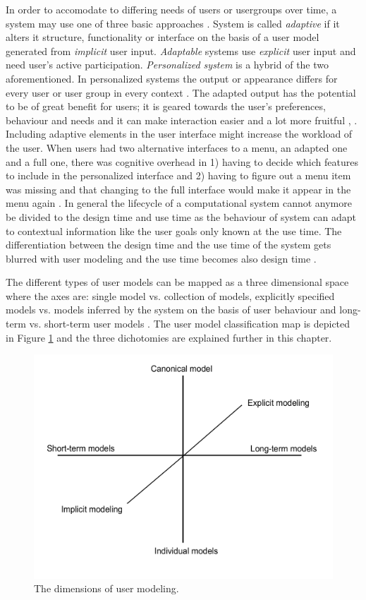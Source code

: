 \documentclass{sigchi}
\begin{document}
In order to accomodate to differing needs of users or usergroups over time, a system may use one of three basic approaches \cite{van08}. System is called \textit{adaptive} if it alters it structure, functionality or interface on the basis of a user model generated from \textit{implicit} user input. \textit{Adaptable} systems use \textit{explicit} user input and need user's active participation. \textit{Personalized system} is a hybrid of the two aforementioned. In personalized systems the output or appearance differs for every user or user group in every context \cite{van08}. The adapted output has the potential to be of great benefit for users; it is geared towards the user's preferences, behaviour and needs and it can make interaction easier and a lot more fruitful \cite{van08},\cite{brusi96} . Including adaptive elements in the user interface might increase the workload of the user. When users had two alternative interfaces to a menu, an adapted one and a full one, there was cognitive overhead in 1) having to decide which features to include in the personalized interface and 2) having to figure out a menu item was missing and that changing to the full interface would make it appear in the menu again \cite{bunt04}. In general the lifecycle of a computational system cannot anymore be divided to the design time and use time as the behaviour of system can adapt to contextual information like the user goals only known at the use time. The differentiation between the design time and the use time of the system gets blurred with user modeling and the use time becomes also design time \cite{fischer01}.

The different types of user models can be mapped as a three dimensional space where the axes are: single model vs. collection of models, explicitly specified models vs. models inferred by the system on the basis of user behaviour and long-term vs. short-term user models \cite{rich99}. The user model classification map is depicted in Figure \ref{dim_UM} and the three dichotomies are explained further in this chapter. 

\begin{figure}[htp] %
\caption{The dimensions of user modeling.} \label{dim_UM}
\includegraphics[scale=0.4]{figures/dimensions_UM.pdf} 
\end{figure}
\end{document}
